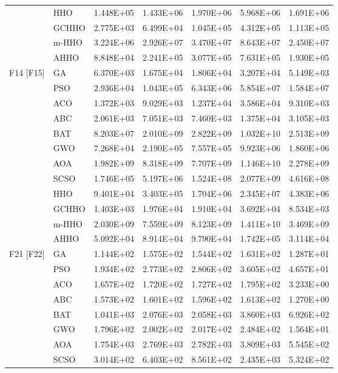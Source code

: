 \begin{longtable}{llrrrrr}
 & HHO & 1.448E+05 & 1.433E+06 & 1.970E+06 & 5.968E+06 & 1.691E+06 \\
 & GCHHO & 2.775E+03 & 6.499E+04 & 1.045E+05 & 4.312E+05 & 1.113E+05 \\
 & m-HHO & 3.224E+06 & 2.926E+07 & 3.470E+07 & 8.643E+07 & 2.450E+07 \\
 & AHHO & 8.848E+04 & 2.241E+05 & 3.077E+05 & 7.631E+05 & 1.930E+05 \\
\addlinespace
F14 [F15] & GA & 6.370E+03 & 1.675E+04 & 1.806E+04 & 3.207E+04 & 5.149E+03 \\
 & PSO & 2.936E+04 & 1.043E+05 & 6.343E+06 & 5.854E+07 & 1.584E+07 \\
 & ACO & 1.372E+03 & 9.029E+03 & 1.237E+04 & 3.586E+04 & 9.310E+03 \\
 & ABC & 2.061E+03 & 7.051E+03 & 7.460E+03 & 1.375E+04 & 3.105E+03 \\
 & BAT & 8.203E+07 & 2.010E+09 & 2.822E+09 & 1.032E+10 & 2.513E+09 \\
 & GWO & 7.268E+04 & 2.190E+05 & 7.557E+05 & 9.923E+06 & 1.860E+06 \\
 & AOA & 1.982E+09 & 8.318E+09 & 7.707E+09 & 1.146E+10 & 2.278E+09 \\
 & SCSO & 1.746E+05 & 5.197E+06 & 1.524E+08 & 2.077E+09 & 4.616E+08 \\
 & HHO & 9.401E+04 & 3.403E+05 & 1.704E+06 & 2.345E+07 & 4.383E+06 \\
 & GCHHO & 1.403E+03 & 1.976E+04 & 1.910E+04 & 3.692E+04 & 8.534E+03 \\
 & m-HHO & 2.030E+09 & 7.559E+09 & 8.123E+09 & 1.411E+10 & 3.469E+09 \\
 & AHHO & 5.092E+04 & 8.914E+04 & 9.790E+04 & 1.742E+05 & 3.114E+04 \\
\addlinespace
F21 [F22] & GA & 1.144E+02 & 1.575E+02 & 1.544E+02 & 1.631E+02 & 1.287E+01 \\
 & PSO & 1.934E+02 & 2.773E+02 & 2.806E+02 & 3.605E+02 & 4.657E+01 \\
 & ACO & 1.657E+02 & 1.720E+02 & 1.727E+02 & 1.795E+02 & 3.233E+00 \\
 & ABC & 1.573E+02 & 1.601E+02 & 1.596E+02 & 1.613E+02 & 1.270E+00 \\
 & BAT & 1.041E+03 & 2.076E+03 & 2.058E+03 & 3.860E+03 & 6.926E+02 \\
 & GWO & 1.796E+02 & 2.002E+02 & 2.017E+02 & 2.484E+02 & 1.564E+01 \\
 & AOA & 1.754E+03 & 2.769E+03 & 2.782E+03 & 3.809E+03 & 5.545E+02 \\
 & SCSO & 3.014E+02 & 6.403E+02 & 8.561E+02 & 2.435E+03 & 5.324E+02 \\

\end{longtable}
